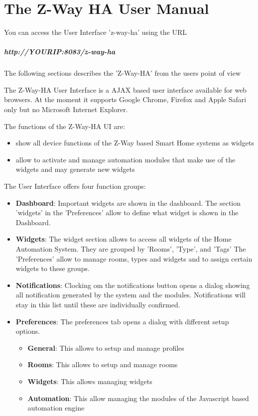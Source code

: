 \chapter{The Z-Way HA User Manual}
\label{vdev}

You can access the User Interface 'z-way-ha' using the URL

\paragraph{http://YOURIP:8083/z-way-ha}
\paragraph{}

The following sections describes the 'Z-Way-HA' from the users point of view  

The Z-Way-HA User Interface is a AJAX based user interface available for web browsers. At 
the moment it supports Google Chrome, Firefox and Apple Safari only but no Microsoft Internet
Explorer.

The functions of the Z-Way-HA UI are:

\begin{itemize}
\item show all device functions of the Z-Way based Smart Home systems as widgets
\item allow to activate and manage automation modules that make use of the widgets
and may generate new widgets
\end{itemize}

The User Interface offers four function groups:

\begin{itemize}
\item \textbf{Dashboard}: Important widgets are shown in the dashboard. The section 'widgets'
in the 'Preferences' allow to define what widget is shown in the Dashboard.
\item \textbf{Widgets}: The widget section allows to access all widgets of the Home 
Automation System. They are grouped by 'Rooms', 'Type', and 'Tags' The 'Preferences'
allow to manage rooms, types and widgets and to assign certain widgets to these groups.
\item \textbf{Notifications}: Clocking om the notifications button opens a dialog showing all 
notification generated by the system and the modules. Notifications will stay in this list
until these are individually confirmed.
\item \textbf{Preferences}: The preferences tab opens a dialog with different setup options.
\begin{itemize}
\item \textbf{General}:  This allows to setup and manage profiles
\item \textbf{Rooms}:  This allows to setup and manage rooms
\item \textbf{Widgets}:  This allows managing widgets
\item \textbf{Automation}:  This allow managing the modules of the Javascript based 
automation engine
\end{itemize}
\end{itemize}

